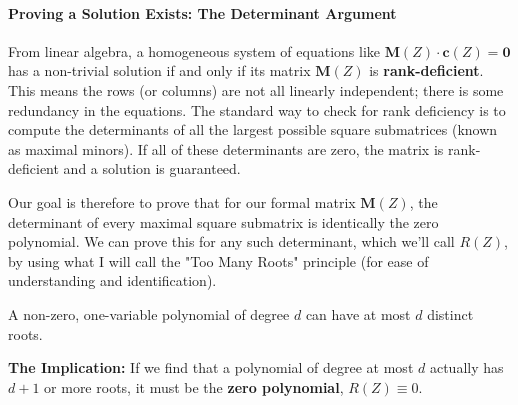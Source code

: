 \documentclass{article}
\begin{document}
\paragraph{Proving a Solution Exists: The Determinant Argument}
From linear algebra, a homogeneous system of equations like $\mathbf{M}(Z) \cdot \mathbf{c}(Z) = \mathbf{0}$ has a non-trivial solution if and only if its matrix $\mathbf{M}(Z)$ is \textbf{rank-deficient}. This means the rows (or columns) are not all linearly independent; there is some redundancy in the equations. The standard way to check for rank deficiency is to compute the determinants of all the largest possible square submatrices (known as maximal minors). If all of these determinants are zero, the matrix is rank-deficient and a solution is guaranteed.

Our goal is therefore to prove that for our formal matrix $\mathbf{M}(Z)$, the determinant of every maximal square submatrix is identically the zero polynomial. We can prove this for any such determinant, which we'll call $R(Z)$, by using what I will call the "Too Many Roots" principle (for ease of understanding and identification).

\begin{tcolorbox}[breakable, title={The "Too Many Roots" Principle}]
A non-zero, one-variable polynomial of degree $d$ can have at most $d$ distinct roots.
\begin{center}
\end{center}
\textbf{The Implication:} If we find that a polynomial of degree at most $d$ actually has $d+1$ or more roots, it must be the \textbf{zero polynomial}, $R(Z) \equiv 0$.
\end{tcolorbox}
\end{document}
